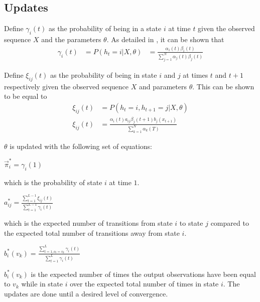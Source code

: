 \documentclass[letterpaper]{article}
\begin{document}
\subsection{Updates}
Define $\gamma_{i}(t)$ as the probability of being in a state $i$ at time $t$ given the observed sequence $X$ and the parameters $\theta$. As detailed in \cite{rab2}, it can be shown that
\begin{align*}
	\gamma_{i}(t) & = P(h_{t}=i|X,\theta) & = \frac{\alpha_{i}(t)\beta_{i}(t)}{\sum_{j=1}^N \alpha_{j}(t)\beta_{j}(t)} 
\end{align*}

Define $\xi_{ij}(t)$ as the probability of being in state $i$ and $j$ at times $t$ and $t+1$ respectively given the observed sequence $X$ and parameters $\theta$. This can be shown to be equal to
\begin{align*}
	\xi_{ij}(t) & = P(h_{t}=i,h_{t+1}=j|X,\theta)                                                       \\
	\xi_{ij}(t) & = \frac{\alpha_{i}(t) a_{ij} \beta_{j}(t+1) b_{j}(x_{t+1})}{\sum_{k=1}^N \alpha_k(T)} 
\end{align*}

$\theta$ is updated with the following set of equations:

\begin{center}
	$\vec \pi_{i}^* = \gamma_{i}(1)$
\end{center}
which is the probability of state $i$ at time $1$.

\begin{center}
	$a_{ij}^*=\frac{\sum^{L-1}_{t=1}\xi_{ij}(t)}{\sum^{L-1}_{t=1}\gamma_{i}(t)}$
\end{center}
which is the expected number of transitions from state $i$ to state $j$ compared to the expected total number of transitions away from state $i$.

\begin{center}
	$b_{i}^*(v_{k})=\frac{\sum^L_{t=1,o_{t}=v_{k}} \gamma_{i}(t)}{\sum^L_{t=1} \gamma_i(t)}$
\end{center}

$b_{i}^*(v_{k})$ is the expected number of times the output observations have been equal to $v_{k}$ while in state $i$ over the expected total number of times in state $i$. The updates are done until a desired level of convergence.
\end{document}
